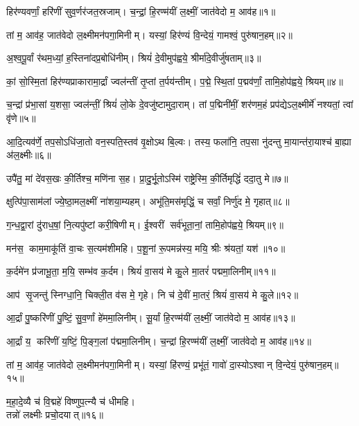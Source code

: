 

हिर॑ण्यवर्णां॒ हरि॑णीं सुव॒र्णर॑जत॒स्रजाम्।
च॒न्द्रां॒ हि॒रण्म॑यीं ल॒क्ष्मीं॒ जात॑वेदो म॒ आव॑ह॥१॥

तां म॒ आव॑ह॒ जात॑वेदो ल॒क्ष्मीमन॑पगा॒मिनीम्।
यस्यां॒ हिर॑ण्यं वि॒न्देयं॒ गामश्वं॒ पुरु॑षान॒हम्॥२॥

अ॒श्व॒पू॒र्वां र॑थम॒ध्यां॒ ह॒स्तिना॑दप्र॒बोधि॑नीम्।
श्रियं॑ दे॒वीमुप॑ह्वये॒ श्रीर्मा॑दे॒वीर्जु॑षताम्॥३॥

कां॒ सो॒\aav{}स्मि॒तां हिर॑ण्यप्राकारामा॒र्द्रां ज्वल॑न्तीं तृ॒प्तां त॒र्पय॑न्तीम्।
प॒द्मे॒ स्थि॒तां प॒द्मव॑र्णां॒ तामि॒होप॑ह्वये॒ श्रियम्॥४॥

च॒न्द्रां प्र॑भा॒सां य॒शसा॒ ज्वल॑न्तीं॒ श्रियं॑ लो॒के दे॒वजु॑ष्टामुदा॒राम्।
तां प॒द्मिनी॑मीं॒ शर॑णम॒हं प्रप॑द्येऽल॒क्ष्मीर्मे॑ नश्यतां॒ त्वां वृ॑णे॥५॥

आ॒दि॒त्यव॑र्णे॒ तप॒सोऽधि॑जा॒तो वन॒स्पति॒स्तव॑ वृ॒क्षोऽथ बि॒ल्वः।
तस्य॒ फला॑नि॒ तप॒सा नु॑दन्तु मा॒यान्त॑रा॒याश्च॑ बा॒ह्या अ॑ल॒क्ष्मीः॥६॥

उपै॑तु॒ मां दे॑वस॒खः की॒र्तिश्च॒ मणि॑ना स॒ह।
प्रा॒दु॒र्भू॒तोऽस्मि॑ राष्ट्रे॒\aav{}स्मि॒\an{} की॒र्तिमृद्धिं॑ ददा॒तु मे॥७॥

क्षुत्पि॑पा॒साम॑लां ज्ये॒ष्ठा॒मल॒क्ष्मीं ना॑शया॒म्यहम्।
अभू॑ति॒मस॑मृद्धिं॒ च सर्वां॒ निर्णु॑द मे॒ गृहात्॥८॥

ग॒न्ध॒द्वा॒रां दु॑राध॒\ar{}षां॒ नि॒त्यपु॑ष्टां करी॒षिणीम्।
ई॒श्वरीं सर्व॑भूता॒नां॒ तामि॒होप॑ह्वये॒ श्रियम्॥९॥

मन॑स॒ काम॒माकू॑तिं वा॒चः स॒त्यम॑शीमहि।
प॒शू॒नां रू॒पमन्न॑स्य॒ मयि॒ श्रीः श्र॑यतां॒ यश॑॥१०॥

क॒र्दमे॑न प्र॑जाभू॒ता॒ म॒यि॒ सम्भ॑व क॒र्दम।
श्रियं॑ वा॒सय॑ मे कु॒ले मा॒तरं॑ पद्ममा॒लिनीम्॥११॥

आप॑ सृ॒जन्तु॑ स्निग्धा॒नि॒ चिक्ली॒त व॑स मे॒ गृहे।
नि च॑ दे॒वीं मा॒तरं॒ श्रियं॑ वा॒सय॑ मे कु॒ले॥१२॥

आ॒र्द्रां पु॒ष्करि॑णीं पु॒ष्टिं॒ सु॒व॒र्णां हे॑ममा॒लिनीम्।
सू॒र्यां हि॒रण्म॑यीं ल॒क्ष्मीं॒ जात॑वेदो म॒ आव॑ह॥१३॥

आ॒र्द्रां य॒ करि॑णीं य॒ष्टिं॒ पि॒ङ्ग॒लां प॑द्ममा॒लिनीम्।
च॒न्द्रां हि॒रण्म॑यीं ल॒क्ष्मीं॒ जात॑वेदो म॒ आव॑ह॥१४॥

तां म॒ आव॑ह॒ जात॑वेदो ल॒क्ष्मीमन॑पगा॒मिनीम्।
यस्यां॒ हि॑रण्यं॒ प्रभू॑तं॒ गावो॑ दा॒स्योऽश्वान् वि॒न्देयं॒ पुरु॑षान॒हम्॥१५॥

\begin{center}
{म॒हा॒दे॒व्यै च॑ वि॒द्महे॑ विष्णुप॒त्न्यै च॑ धीमहि।\\
तन्नो॑ लक्ष्मीः प्रचो॒दयात्॥१६॥}
\end{center}